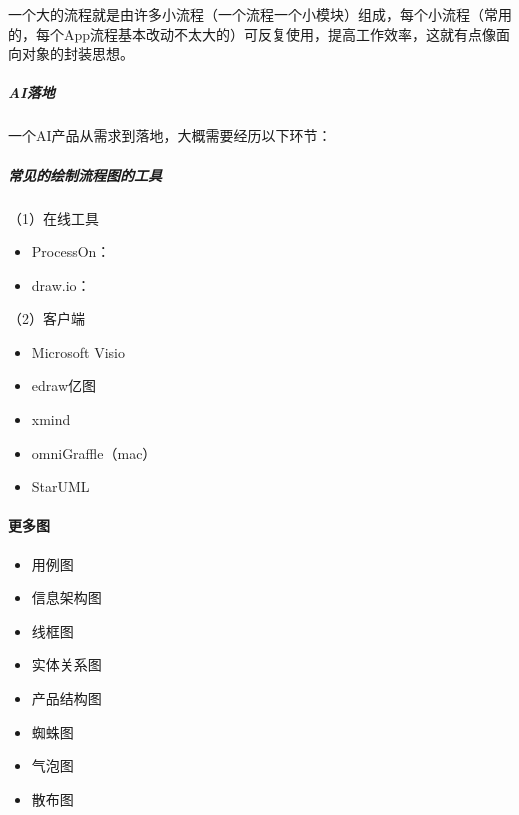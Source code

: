 \documentclass[letterpaper,11pt,english]{sphinxmanual}
\begin{document}
一个大的流程就是由许多小流程（一个流程一个小模块）组成，每个小流程（常用的，每个App流程基本改动不太大的）可反复使用，提高工作效率，这就有点像面向对象的封装思想。


\subparagraph{AI落地}
\label{\detokenize{chapter_knowledge/flow_chart:ai}}
一个AI产品从需求到落地，大概需要经历以下环节：



\subparagraph{常见的绘制流程图的工具}
\label{\detokenize{chapter_knowledge/flow_chart:id21}}
（1）在线工具
\begin{itemize}
\item {} 
ProcessOn：

\item {} 
draw.io：

\end{itemize}

（2）客户端
\begin{itemize}
\item {} 
Microsoft Visio

\item {} 
edraw亿图

\item {} 
xmind

\item {} 
omniGraffle（mac）

\item {} 
StarUML

\end{itemize}


\paragraph{更多图}
\label{\detokenize{chapter_knowledge/flow_chart:id22}}\begin{itemize}
\item {} 
用例图

\item {} 
信息架构图

\item {} 
线框图

\item {} 
实体关系图%
\begin{footnote}[514]\sphinxAtStartFootnote
{}
%
\end{footnote}

\item {} 
产品结构图

\item {} 
蜘蛛图

\item {} 
气泡图

\item {} 
散布图

\end{itemize}
\end{document}
